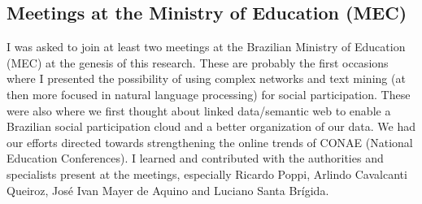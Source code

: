 \begin{apendicesenv}
\section{Meetings at the Ministry of Education (MEC)}
I was asked to join at least two meetings at the Brazilian Ministry of Education (MEC)
at the genesis of this research.
These are probably the first occasions where I presented the possibility of using
complex networks and text mining (at then more focused in natural language processing)
for social participation.
These were also where we first thought about linked data/semantic web to enable a
Brazilian social participation cloud and a better organization of our data.
We had our efforts directed towards strengthening the online trends of CONAE (National Education Conferences).
I learned and contributed with the authorities and specialists present at the meetings,
especially Ricardo Poppi, Arlindo Cavalcanti Queiroz, José Ivan Mayer de Aquino and Luciano Santa Brígida.


\end{apendicesenv}
